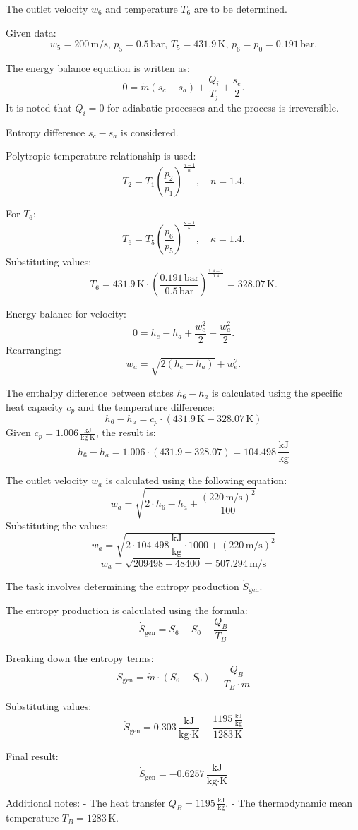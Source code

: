 The outlet velocity \( w_6 \) and temperature \( T_6 \) are to be determined.  

Given data:  
\[
w_5 = 200 \, \text{m/s}, \, p_5 = 0.5 \, \text{bar}, \, T_5 = 431.9 \, \text{K}, \, p_6 = p_0 = 0.191 \, \text{bar}.
\]

The energy balance equation is written as:  
\[
0 = \dot{m} (s_c - s_a) + \frac{Q_i}{T_j} + \frac{s_e}{2}.
\]  
It is noted that \( Q_i = 0 \) for adiabatic processes and the process is irreversible.  

Entropy difference \( s_c - s_a \) is considered.  

Polytropic temperature relationship is used:  
\[
T_2 = T_1 \left( \frac{p_2}{p_1} \right)^{\frac{n-1}{n}}, \quad n = 1.4.
\]  

For \( T_6 \):  
\[
T_6 = T_5 \left( \frac{p_6}{p_5} \right)^{\frac{\kappa - 1}{\kappa}}, \quad \kappa = 1.4.
\]  
Substituting values:  
\[
T_6 = 431.9 \, \text{K} \cdot \left( \frac{0.191 \, \text{bar}}{0.5 \, \text{bar}} \right)^{\frac{1.4 - 1}{1.4}} = 328.07 \, \text{K}.
\]

Energy balance for velocity:  
\[
0 = h_e - h_a + \frac{w_e^2}{2} - \frac{w_a^2}{2}.
\]  
Rearranging:  
\[
w_a = \sqrt{2 (h_e - h_a)} + w_e^2.
\]

The enthalpy difference between states \( h_6 - h_a \) is calculated using the specific heat capacity \( c_p \) and the temperature difference:  
\[
h_6 - h_a = c_p \cdot (431.9 \, \text{K} - 328.07 \, \text{K})
\]  
Given \( c_p = 1.006 \, \frac{\text{kJ}}{\text{kg·K}} \), the result is:  
\[
h_6 - h_a = 1.006 \cdot (431.9 - 328.07) = 104.498 \, \frac{\text{kJ}}{\text{kg}}
\]  

The outlet velocity \( w_a \) is calculated using the following equation:  
\[
w_a = \sqrt{2 \cdot h_6 - h_a + \frac{(220 \, \text{m/s})^2}{100}}
\]  
Substituting the values:  
\[
w_a = \sqrt{2 \cdot 104.498 \, \frac{\text{kJ}}{\text{kg}} \cdot 1000 + (220 \, \text{m/s})^2}
\]  
\[
w_a = \sqrt{209498 + 48400} = 507.294 \, \text{m/s}
\]

The task involves determining the entropy production \( \dot{S}_{\text{gen}} \).  

The entropy production is calculated using the formula:  
\[
\dot{S}_{\text{gen}} = S_6 - S_0 - \frac{Q_B}{T_B}
\]

Breaking down the entropy terms:  
\[
S_{\text{gen}} = \dot{m} \cdot \left( S_6 - S_0 \right) - \frac{Q_B}{T_B \cdot \dot{m}}
\]

Substituting values:  
\[
\dot{S}_{\text{gen}} = 0.303 \, \frac{\text{kJ}}{\text{kg·K}} - \frac{1195 \, \frac{\text{kJ}}{\text{kg}}}{1283 \, \text{K}}
\]

Final result:  
\[
\dot{S}_{\text{gen}} = -0.6257 \, \frac{\text{kJ}}{\text{kg·K}}
\]  

Additional notes:  
- The heat transfer \( Q_B = 1195 \, \frac{\text{kJ}}{\text{kg}} \).  
- The thermodynamic mean temperature \( T_B = 1283 \, \text{K} \).